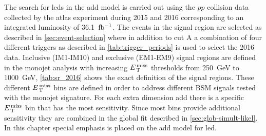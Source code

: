 The search for \glspl{led} in the \gls{add} model is carried out using the $pp$
collision data collected by the \gls{atlas} experiment during 2015 and 2016
corresponding to an integrated luminosity of 36.1~$\mbox{fb$^{-1}$}$. The events in the
signal region are selected as described in \cref{sec:event-selection} where in
addition to cut A a combination of four different triggers as described in
\cref{tab:trigger_periods} is used to select the 2016 data. Inclusive (IM1-IM10)
and exclusive (EM1-EM9) signal regions are defined in the monojet analysis with
increasing $E_\mathrm{\, T}^\mathrm{\, miss}$ thresholds from 250~GeV to 1000~GeV, \cref{tab:sr_2016} shows
the exact definition of the signal regions. These different $E_\mathrm{\, T}^\mathrm{\, miss}$ bins are
defined in order to address different BSM signals tested with the monojet
signature. For each extra dimension \gls{add} there is a specific $E_\mathrm{\, T}^\mathrm{\, miss}$ bin
that has the most sensitivity. Since most bins provide additional sensitivity
they are combined in the global fit described in
\cref{sec:glob-simult-likel}. In this chapter special emphasis is placed on the
\gls{add} model for \gls{led}.
